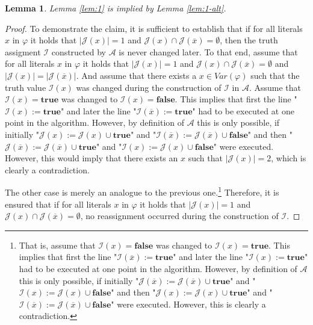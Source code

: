 \documentclass [11pt]{article}
\def\II{{\cal I}}
\newcommand{\True}{\mathbf{true}}
\newcommand{\False}{\mathbf{false}}
\newcommand{\var}{\mathit{Var}}
\newtheorem{lemma}[theorem]{Lemma}
\begin{document}
\begin{lemma}
\label{lem:connect}
Lemma \ref{lem:1} is implied by Lemma \ref{lem:1-alt}.
\end{lemma}
\begin{proof}
To demonstrate the claim, it is sufficient to establish that 
if for all literals $x$ in $\varphi$ it holds that $|\mathcal{J}(x)|=1$ and $\mathcal{J}(x) \cap \mathcal{J}(\overline{x}) = \emptyset$, then the truth assigment $\mathcal{I}$ constructed by $\mathcal{A}$ is never changed later.
To that end, assume that for all literals $x$ in $\varphi$ it holds that $|\mathcal{J}(x)|=1$ and $\mathcal{J}(x) \cap \mathcal{J}(\overline{x}) = \emptyset$ and $|\mathcal{J}(x)| =| \mathcal{J}(\overline{x})|$. And assume that there exists a $x \in \var(\varphi)$ such that the truth value $\mathcal{I}(x)$ was changed during the construction of $\mathcal{I}$ in $\mathcal{A}$. 
Assume that $\mathcal{I}(x)=\True$ was changed to $\mathcal{I}(x)=\False$. This implies that first the line "$\mathcal{I}(x):=\True$" and later the line "$\mathcal{I}(\overline{x}):=\True$" had to be executed at one point in the algorithm. However, by definition of $\mathcal{A}$ this is only possible, if initially "$\mathcal{J}(x):=\mathcal{J}(x) \cup \True$" and "$\mathcal{I}(\overline{x}):=\mathcal{J}(\overline{x}) \cup \False$" and then "$\mathcal{J}(\overline{x}):=\mathcal{J}(\overline{x}) \cup \True$" and "$\mathcal{I}(x):=\mathcal{J}(x) \cup \False$" were executed. However, this would imply that there exists an $x$ such that $|\mathcal{J}(x)|=2$, which is clearly a contradiction.

The other case is merely an analogue to the previous one.\footnote{That is, assume that $\mathcal{I}(x)=\False$ was changed to $\mathcal{I}(x)=\True$. This implies that first the line "$\mathcal{I}(\overline{x}):=\True$" and later the line "$\mathcal{I}(x):=\True$" had to be executed at one point in the algorithm. However, by definition of $\mathcal{A}$ this is only possible, if initially "$\mathcal{J}(\overline{x}):=\mathcal{J}(\overline{x}) \cup \True$" and "$\mathcal{I}(x):=\mathcal{J}(x) \cup \False$" and then "$\mathcal{J}(x):=\mathcal{J}(x) \cup \True$" and "$\mathcal{I}(\overline{x}):=\mathcal{J}(\overline{x}) \cup \False$" were executed. However, this is clearly a contradiction.}
 Therefore, it is ensured that if for all literals $x$ in $\varphi$ it holds that $|\mathcal{J}(x)|=1$ and $\mathcal{J}(x) \cap \mathcal{J}(\overline{x}) = \emptyset$, no reassignment occurred during the construction of $\mathcal{I}$.
\end{proof}
\end{document}
